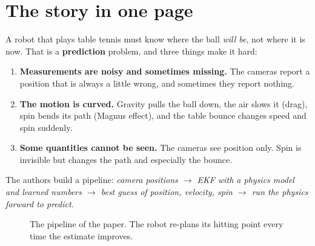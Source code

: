 \documentclass[11pt,a4paper]{article}
\newcommand{\vv}{\mathbf{v}}
\newcommand{\pp}{\mathbf{p}}
\newcommand{\ww}{\boldsymbol{\omega}}
\begin{document}
\tableofcontents
\newpage

\section{The story in one page}
A robot that plays table tennis must know where the ball \emph{will be}, not where it is now. That is a \textbf{prediction} problem, and three things make it hard:
\begin{enumerate}
\item \textbf{Measurements are noisy and sometimes missing.} The cameras report a position that is always a little wrong, and sometimes they report nothing.
\item \textbf{The motion is curved.} Gravity pulls the ball down, the air slows it (drag), spin bends its path (Magnus effect), and the table bounce changes speed and spin suddenly.
\item \textbf{Some quantities cannot be seen.} The cameras see position only. Spin is invisible but changes the path and especially the bounce.
\end{enumerate}
The authors build a pipeline: \emph{camera positions $\rightarrow$ EKF with a physics model and learned numbers $\rightarrow$ best guess of position, velocity, spin $\rightarrow$ run the physics forward to predict.}

\begin{figure}[htbp]
\centering
{}
\caption{The pipeline of the paper. The robot re-plans its hitting point every time the estimate improves.}
\end{figure}
\end{document}
